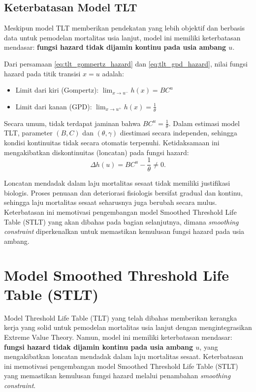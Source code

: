 \subsection{Keterbatasan Model TLT}

Meskipun model TLT memberikan pendekatan yang lebih objektif dan berbasis data untuk pemodelan mortalitas usia lanjut, model ini memiliki keterbatasan mendasar: \textbf{fungsi hazard tidak dijamin kontinu pada usia ambang $u$}.

Dari persamaan \eqref{eq:tlt_gompertz_hazard} dan \eqref{eq:tlt_gpd_hazard}, nilai fungsi hazard pada titik transisi $x = u$ adalah:
\begin{itemize}
    \item Limit dari kiri (Gompertz): $\lim_{x \to u^-} h(x) = BC^u$
    \item Limit dari kanan (GPD): $\lim_{x \to u^+} h(x) = \frac{1}{\theta}$
\end{itemize}

Secara umum, tidak terdapat jaminan bahwa $BC^u = \frac{1}{\theta}$. Dalam estimasi model TLT, parameter $(B, C)$ dan $(\theta, \gamma)$ diestimasi secara independen, sehingga kondisi kontinuitas tidak secara otomatis terpenuhi. Ketidaksamaan ini mengakibatkan diskontinuitas (loncatan) pada fungsi hazard:
\begin{equation}
\Delta h(u) = BC^u - \frac{1}{\theta} \neq 0.
\label{eq:hazard_jump}
\end{equation}

Loncatan mendadak dalam laju mortalitas sesaat tidak memiliki justifikasi biologis. Proses penuaan dan deteriorasi fisiologis bersifat gradual dan kontinu, sehingga laju mortalitas sesaat seharusnya juga berubah secara mulus. Keterbatasan ini memotivasi pengembangan model Smoothed Threshold Life Table (STLT) yang akan dibahas pada bagian selanjutnya, dimana \textit{smoothing constraint} diperkenalkan untuk memastikan kemulusan fungsi hazard pada usia ambang.
\section{Model Smoothed Threshold Life Table (STLT)}

Model Threshold Life Table (TLT) yang telah dibahas memberikan kerangka kerja yang solid untuk pemodelan mortalitas usia lanjut dengan mengintegrasikan Extreme Value Theory. Namun, model ini memiliki keterbatasan mendasar: \textbf{fungsi hazard tidak dijamin kontinu pada usia ambang $u$}, yang mengakibatkan loncatan mendadak dalam laju mortalitas sesaat. Keterbatasan ini memotivasi pengembangan model Smoothed Threshold Life Table (STLT) yang memastikan kemulusan fungsi hazard melalui penambahan \textit{smoothing constraint}.

